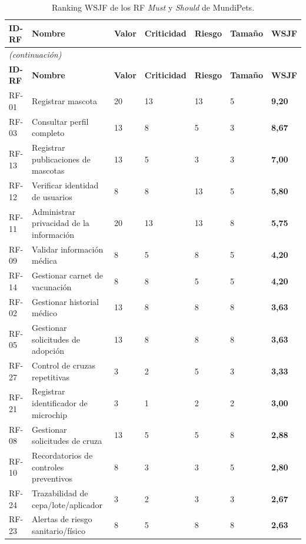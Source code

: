 \documentclass[journal,onecolumn]{IEEEtran}
\begin{document}
	\begin{longtable}{@{}p{1.4cm} p{5.4cm} p{1.5cm} p{1.5cm} p{1.5cm} p{1.5cm} p{1.3cm}@{}}
		\caption{Ranking WSJF de los RF \emph{Must} y \emph{Should} de MundiPets.}
		\label{tab:wsjf} \\
		\hline
		\textbf{ID-RF} & \textbf{Nombre} & \textbf{Valor} & \textbf{Criticidad} & \textbf{Riesgo} & \textbf{Tamaño} & \textbf{WSJF} \\
		\hline
		\endfirsthead
		\multicolumn{7}{|l|}{\textit{(continuación)}} \\
		\hline
		\textbf{ID-RF} & \textbf{Nombre} & \textbf{Valor} & \textbf{Criticidad} & \textbf{Riesgo} & \textbf{Tamaño} & \textbf{WSJF} \\
		\hline
		\endhead
		\hline
		\endfoot
		RF-01 & Registrar mascota & 20 & 13 & 13 & 5 & \textbf{9,20} \\
		\hline
		RF-03 & Consultar perfil completo & 13 & 8 & 5 & 3 & \textbf{8,67} \\
		\hline
		RF-13 & Registrar publicaciones de mascotas & 13 & 5 & 3 & 3 & \textbf{7,00} \\
		\hline
		RF-12 & Verificar identidad de usuarios & 8 & 8 & 13 & 5 & \textbf{5,80} \\
		\hline
		RF-11 & Administrar privacidad de la información & 20 & 13 & 13 & 8 & \textbf{5,75} \\
		\hline
		RF-09 & Validar información médica & 8 & 5 & 8 & 5 & \textbf{4,20} \\
		\hline
		RF-14 & Gestionar carnet de vacunación & 8 & 8 & 5 & 5 & \textbf{4,20} \\
		\hline
		RF-02 & Gestionar historial médico & 13 & 8 & 8 & 8 & \textbf{3,63} \\
		\hline
		RF-05 & Gestionar solicitudes de adopción & 13 & 8 & 8 & 8 & \textbf{3,63} \\
		\hline
		RF-27 & Control de cruzas repetitivas & 3 & 2 & 5 & 3 & \textbf{3,33} \\
		\hline
		RF-21 & Registrar identificador de microchip & 3 & 1 & 2 & 2 & \textbf{3,00} \\
		\hline
		RF-08 & Gestionar solicitudes de cruza & 13 & 5 & 5 & 8 & \textbf{2,88} \\
		\hline
		RF-10 & Recordatorios de controles preventivos & 8 & 3 & 3 & 5 & \textbf{2,80} \\
		\hline
		RF-24 & Trazabilidad de cepa/lote/aplicador & 3 & 2 & 3 & 3 & \textbf{2,67} \\
		\hline
		RF-23 & Alertas de riesgo sanitario/físico & 8 & 5 & 8 & 8 & \textbf{2,63} \\

\end{longtable}
\end{document}
